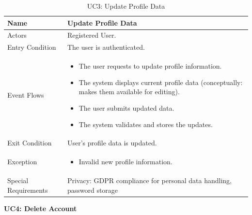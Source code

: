 \begin{table}[H]
    \centering
    \renewcommand{\arraystretch}{1.3}
    \begin{tabular}{|p{}|p{}|}
        \hline
        Name & \textbf{Update Profile Data} \\
        \hline
        Actors & Registered User. \\
        \hline
        Entry Condition & The user is authenticated. \\
        \hline
        Event Flows & \begin{itemize}[topsep=0pt, partopsep=0pt, leftmargin=*]
            \item The user requests to update profile information.
            \item The system displays current profile data (conceptually: makes them available for editing).
            \item The user submits updated data.
            \item The system validates and stores the updates.
        \end{itemize} \\
        \hline
        Exit Condition & User's profile data is updated. \\
        \hline
        Exception & \begin{itemize}[topsep=0pt, partopsep=0pt, leftmargin=*]
            \item Invalid new profile information.
        \end{itemize} \\
        \hline
        Special Requirements & Privacy: GDPR compliance for personal data handling, password storage \\
        \hline
    \end{tabular}
    \caption{UC3: Update Profile Data}
    \label{uc3}
\end{table}

\vspace{12pt}
\noindent
\textbf{UC4: Delete Account}

